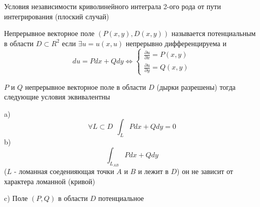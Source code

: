 \begin{title}[\Large]
  Условия независимости криволинейного интеграла 2-ого рода от пути
  интегрирования (плоский случай)
\end{title}

\begin{define}
  Непрерывное векторное поле $(P(x,y), D(x,y))$ называется потенциальным в
  области $D \subset R^2$ если $\exists u = u(x,u)$ непрерывно дифференцируема
  и
  $$
  du = Pdx + Qdy \Leftrightarrow
  \left\{
  \begin{array}{c}
    \frac{\partial u}{\partial x} = P(x, y) \\

    \frac{\partial u}{\partial y} = Q(x, y)
  \end{array}
  \right.
  $$
\end{define}

\begin{theorem}
  $P$ и $Q$ непрерывное векторное поле в области $D$ (дырки разрешены) тогда
  следующие условия эквивалентны

  a)
  $$
  \forall L \subset D ~~ \int_L Pdx + Qdy = 0
  $$
  b)
  $$
  \int_{L_{AB}} Pdx + Qdy
  $$
  ($L$ - ломанная соеденияющая точки $A$ и $B$ и лежит в $D$)
  он не зависит от характера ломанной (кривой)

  c) Поле $(P, Q)$ в области $D$ потенциальное
\end{theorem}

